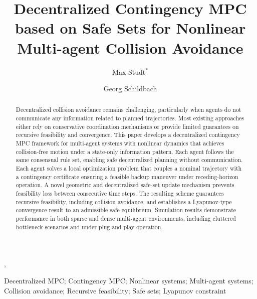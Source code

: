 \documentclass[twocolumn]{autart}
\begin{document}
\begin{frontmatter}

\title{Decentralized Contingency MPC based on Safe Sets for Nonlinear Multi-agent Collision Avoidance}

\author[Inst1]{Max Studt$^\ast$}, \
\author[Inst1]{Georg Schildbach}
\address[Inst1]{Institute for Electrical Engineering in Medicine, University of Luebeck, Luebeck, Germany}

\begin{keyword}
Decentralized MPC; Contingency MPC; Nonlinear systems; Multi-agent systems; Collision avoidance;
Recursive feasibility; Safe sets; Lyapunov constraint
\end{keyword}

\begin{abstract}
Decentralized collision avoidance remains challenging, particularly when agents do not communicate any information related to planned trajectories. Most existing approaches either rely on conservative coordination mechanisms or provide limited guarantees on recursive feasibility and convergence. This paper develops a decentralized contingency MPC framework for multi-agent systems with nonlinear dynamics that achieves collision-free motion under a state-only information pattern. Each agent follows the same consensual rule set, enabling safe decentralized planning without communication. Each agent solves a local optimization problem that couples a nominal trajectory with a contingency certificate ensuring a feasible backup maneuver under receding-horizon operation. A novel geometric and decentralized safe-set update mechanism prevents feasibility loss between consecutive time steps. The resulting scheme guarantees recursive feasibility, including collision avoidance, and establishes a Lyapunov-type convergence result to an admissible safe equilibrium. Simulation results demonstrate performance in both sparse and dense multi-agent environments, including cluttered bottleneck scenarios and under plug-and-play operation.
\end{abstract}

\end{frontmatter}

\theoremstyle{plain}
\newtheorem{theorem}{Theorem}
\newtheorem{lemma}{Lemma}
\newtheorem{proposition}{Proposition}
\end{document}
